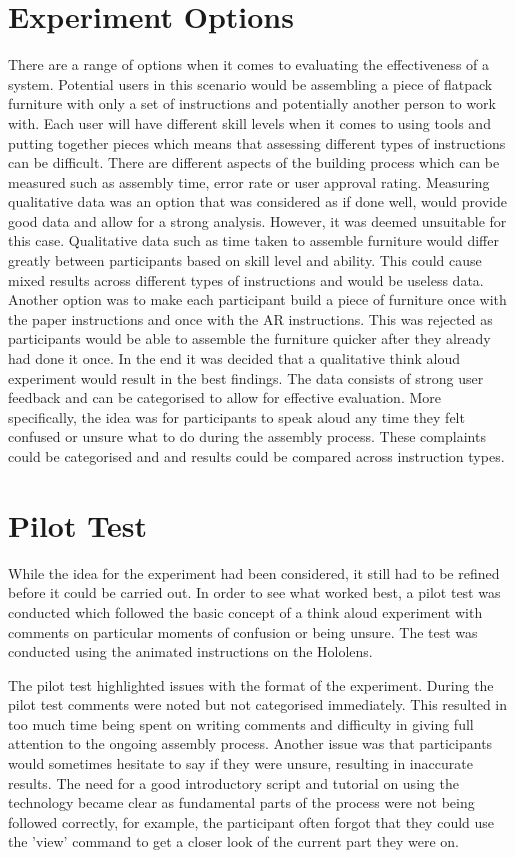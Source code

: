 \documentclass{l4proj}
\begin{document}
\section{Experiment Options}
There are a range of options when it comes to evaluating the effectiveness of a system. Potential users in this scenario would be assembling a piece of flatpack furniture with only a set of instructions and potentially another person to work with. Each user will have different skill levels when it comes to using tools and putting together pieces which means that assessing different types of instructions can be difficult. There are different aspects of the building process which can be measured such as assembly time, error rate or user approval rating. Measuring qualitative data was an option that was considered as if done well, would provide good data and allow for a strong analysis. However, it was deemed unsuitable for this case. Qualitative data such as time taken to assemble furniture would differ greatly between participants based on skill level and ability. This could cause mixed results across different types of instructions and would be useless data. Another option was to make each participant build a piece of furniture once with the paper instructions and once with the AR instructions. This was rejected as participants would be able to assemble the furniture quicker after they already had done it once. In the end it was decided that a qualitative think aloud experiment would result in the best findings. The data consists of strong user feedback and can be categorised to allow for effective evaluation. More specifically, the idea was for participants to speak aloud any time they felt confused or unsure what to do during the assembly process. These complaints could be categorised and and results could be compared across instruction types.
\section{Pilot Test}
While the idea for the experiment had been considered, it still had to be refined before it could be carried out. In order to see what worked best, a pilot test was conducted which followed the basic concept of a think aloud experiment with comments on particular moments of confusion or being unsure. The test was conducted using the animated instructions on the Hololens.

The pilot test highlighted issues with the format of the experiment. During the pilot test comments were noted but not categorised immediately. This resulted in too much time being spent on writing comments and difficulty in giving full attention to the ongoing assembly process. Another issue was that participants would sometimes hesitate to say if they were unsure, resulting in inaccurate results. The need for a good introductory script and tutorial on using the technology became clear as fundamental parts of the process were not being followed correctly, for example, the participant often forgot that they could use the 'view' command to get a closer look of the current part they were on.
\end{document}
